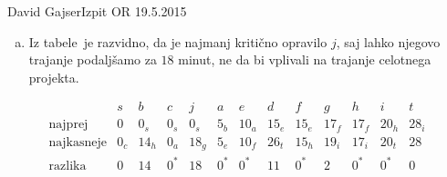 \begin{naloga}{David Gajser}{Izpit OR 19.5.2015}
\begin{odgovor}
\begin{enumerate}[(a)]
\item Iz tabele~ je razvidno,
da je najmanj kritično opravilo $j$,
saj lahko njegovo trajanje podaljšamo za $18$ minut,
ne da bi vplivali na trajanje celotnega projekta.
\end{enumerate}
%
\begin{slika}
\makebox[\textwidth][c]{
\pgfslika
}
\end{slika}
%
\begin{tabela}
$$
\begin{array}{r|cccccccccccc}
& s & b & c & j & a & e & d & f & g & h & i & t \\ \hline
\text{najprej} &
0 & 0_s & 0_s & 0_s & 5_b & 10_a & 15_e & 15_e & 17_f & 17_f & 20_h & 28_i \\
\text{najkasneje} &
0_c & 14_h & 0_a & 18_g & 5_e & 10_f & 26_t & 15_h & 19_i & 17_i & 20_t & 28 \\
\text{razlika} &
0 & 14 & 0^* & 18 & 0^* & 0^* & 11 & 0^* & 2 & 0^* & 0^* & 0
\end{array}
$$
\end{tabela}
\end{odgovor}
\end{naloga}
